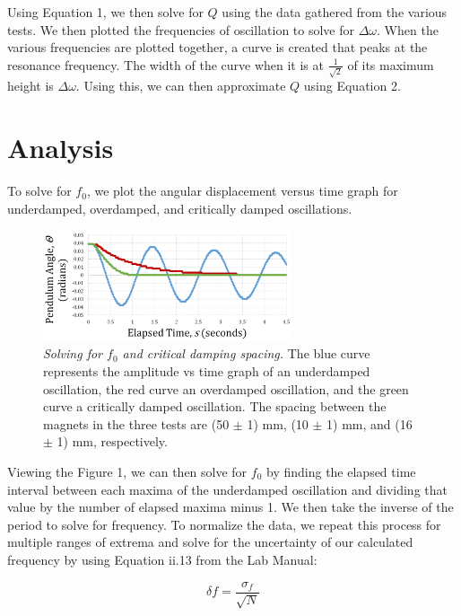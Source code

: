 \documentclass[twoside,twocolumn]{article}
\begin{document}
\hfill


\noindent Using Equation 1, we then solve for $Q$ using the data gathered from the various tests. We then plotted the frequencies of oscillation to solve for $\Delta \omega$. When the various frequencies are plotted together, a curve is created that peaks at the resonance frequency. The width of the curve when it is at $\frac{1}{\sqrt{2}}$ of its maximum height is $\Delta \omega$. Using this, we can then approximate $Q$ using Equation 2.


\section{Analysis}

To solve for $f_0$, we plot the angular displacement versus time graph for underdamped, overdamped, and critically damped oscillations.

\begin{figure}[!htbp]
    \centering
    \includegraphics[width=2.9in]{ThreeFreq1.png}
    \caption{\textit{Solving for $f_0$ and critical damping spacing.} The blue curve represents the amplitude vs time graph of an underdamped oscillation, the red curve an overdamped oscillation, and the green curve a critically damped oscillation. The spacing between the magnets in the three tests are (50 $\pm$ 1) mm, (10 $\pm$ 1) mm, and (16 $\pm$ 1) mm, respectively.}
\end{figure}

\noindent Viewing the Figure 1, we can then solve for $f_0$ by finding the elapsed time interval between each maxima of the underdamped oscillation and dividing that value by the number of elapsed maxima minus 1. We then take the inverse of the period to solve for frequency. To normalize the data, we repeat this process for multiple ranges of extrema and solve for the uncertainty of our calculated frequency by using Equation ii.13 from the Lab Manual:

\footnotesize
\begin{equation}
\delta f = \frac{\sigma_f}{\sqrt{N}}
\end{equation}
\normalsize
\end{document}
